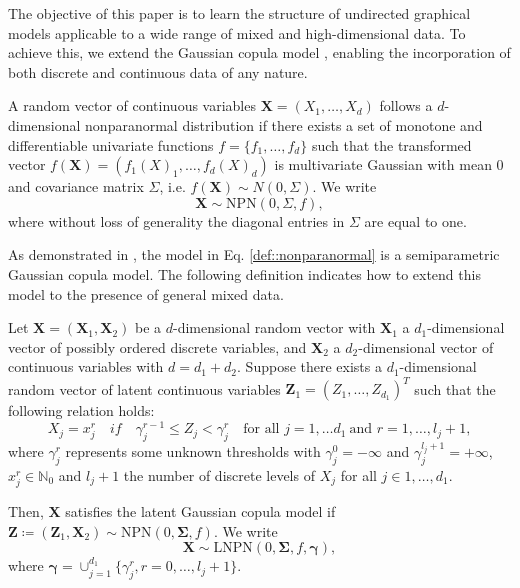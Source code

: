 The objective of this paper is to learn the structure of undirected graphical models applicable to a wide range of mixed and high-dimensional data. To achieve this, we extend the Gaussian copula model \citep{Liu09, Liu12, Xue12}, enabling the incorporation of both discrete and continuous data of any nature.

\begin{definition}
    A random vector of continuous variables \(\mathbf{X} = (X_1, \dots, X_d)\) follows a $d$-dimensional nonparanormal distribution if there exists a set of monotone and differentiable univariate functions $f = \{f_1,\dots, f_d\}$ such that the transformed vector \(f(\mathbf{X}) = (f_1(X)_1, \dots, f_d(X)_d)\) is multivariate Gaussian with mean $0$ and covariance matrix \(\Sigma\), i.e. \(f(\mathbf{X})\sim N(0,\Sigma)\). We write
    \begin{equation}\label{def::nonparanormal}
        \mathbf{X} \sim \text{NPN}(0, \Sigma, f),
    \end{equation}
    where without loss of generality the diagonal entries in \(\Sigma\) are equal to one.
\end{definition}

As demonstrated in \cite{Liu09}, the model in Eq. \eqref{def::nonparanormal} is a semiparametric Gaussian copula model. The following definition indicates how to extend this model to the presence of general mixed data.

\begin{definition}\label{latent_gaussian_cm}
    Let $\mathbf{X} = (\mathbf{X}_1,\mathbf{X}_2)$ be a $d$-dimensional random vector with \(\mathbf{X}_1\) a $d_1$-dimensional vector of possibly ordered discrete variables, and \(\mathbf{X}_2\) a $d_2$-dimensional vector of continuous variables with \(d = d_1 + d_2\). Suppose there exists a $d_1$-dimensional random vector of latent continuous variables $\mathbf{Z}_1 = (Z_1, \dots, Z_{d_1})^T$ such that the following relation holds:
    \begin{equation}\label{latent_ordered}
        X_j = x_j^{r} \quad if \quad \gamma_j^{r-1} \leq Z_j < \gamma_j^r \quad \text{for all } j = 1, \dots d_1 \ \text{and } r = 1, \dots, l_j+1,
    \end{equation}
    where $\gamma^r_j$ represents some unknown thresholds with $\gamma_j^0 = -\infty$ and $\gamma_j^{l_j +1} = +\infty$, $x^r_j \in \mathbb{N}_0$ and $l_{j} +1$ the number of discrete levels of $X_j$ for all $j \in 1, \dots, d_1$.

    Then, $\mathbf{X}$ satisfies the latent Gaussian copula model if $\mathbf{Z} \coloneqq (\mathbf{Z}_1, \mathbf{X}_2) \sim \text{NPN}(0, \mathbf{\Sigma}, f)$. We write
    \begin{equation}
        \mathbf{X} \sim \text{LNPN}(0, \mathbf{\Sigma}, f, \mathbf{\gamma}),
    \end{equation}
    where $\mathbf{\gamma} = \cup_{j=1}^{d_1} \{\gamma_j^r, r = 0, \dots, l_j+1\}$.
\end{definition}


